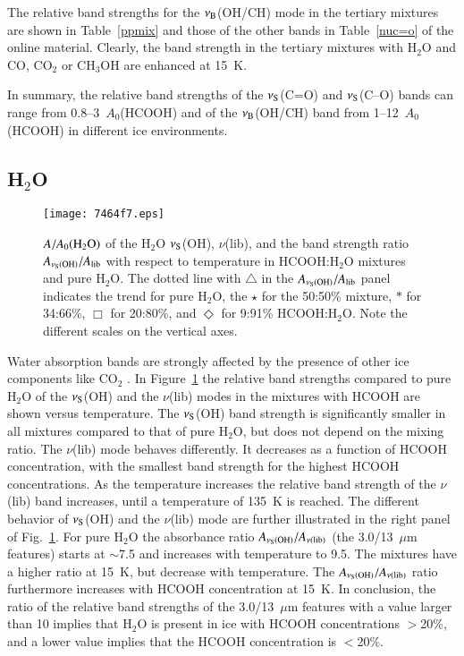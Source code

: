 \documentclass{aa}
\begin{document}
The relative band strengths for the $\nu_{\rm B}$(OH/CH) mode in the
tertiary mixtures are shown in Table~\ref{ppmix} and those of the
other bands in Table~\ref{nuc=o} of the online material. Clearly, the
band strength in the tertiary mixtures with H$_2$O and CO, CO$_2$ or
CH$_3$OH are enhanced at 15~K.

In summary, the relative band strengths of the $\nu_{\rm S}$(C=O) and
$\nu_{\rm S}$(C--O) bands can range from 0.8--3~$A_0$(HCOOH) and of
the $\nu_{\rm B}$(OH/CH) band from 1--12~$A_0$(HCOOH) in different ice
environments.

\subsection{H$_2$O}

\begin{figure}
\centering
\texttt{[image: 7464f7.eps]}
\caption{$A/A_0{\rm ( H_2O)}$ of the H$_2$O $\nu_{\rm S}$(OH),
  $\nu$(lib), and the band strength ratio $A_{\nu\rm_S (OH)}/A_{\rm
    lib}$ with respect to temperature in HCOOH:H$_2$O mixtures and
  pure H$_2$O. The dotted line with $\bigtriangleup$ in the $A_{\rm
    \nu_S(OH)}/A_{\rm lib}$ panel indicates the trend for pure H$_2$O,
  the $\star$ for the 50:50\% mixture, $\ast$ for 34:66\%, $\Box$ for
  20:80\%, and $\Diamond$ for 9:91\% HCOOH:H$_2$O. Note the different
  scales on the vertical axes.}\label{int_comp_h2o}
\end{figure}

Water absorption bands are strongly affected by the presence of other
ice components like CO$_2$ \citep{oberg2007}. In
Figure~\ref{int_comp_h2o} the relative band strengths compared to pure
H$_2$O of the $\nu_{\rm S}$(OH) and the $\nu$(lib) modes in the
mixtures with HCOOH are shown versus temperature. The $\nu_{\rm
  S}$(OH) band strength is significantly smaller in all mixtures
compared to that of pure H$_2$O, but does not depend on the mixing
ratio. The $\nu$(lib) mode behaves differently. It decreases as a
function of HCOOH concentration, with the smallest band strength for
the highest HCOOH concentrations. As the temperature increases the
relative band strength of the $\nu$(lib) band increases, until a
temperature of 135~K is reached. The different behavior of $\nu_{\rm
  S}$(OH) and the $\nu$(lib) mode are further illustrated in the right
panel of Fig.~\ref{int_comp_h2o}. For pure H$_2$O the absorbance ratio
$A_{\nu\rm_S (OH)}/A_{\nu\rm (lib)}$ (the 3.0/13~$\mu$m features)
starts at $\sim$7.5 and increases with temperature to 9.5. The
mixtures have a higher ratio at 15~K, but decrease with
temperature. The $A_{\nu\rm_S (OH)}/A_{\nu\rm (lib)}$ ratio
furthermore increases with HCOOH concentration at 15~K. In conclusion,
the ratio of the relative band strengths of the 3.0/13~$\mu$m features
with a value larger than 10 implies that H$_2$O is present in ice with
HCOOH concentrations $>$20\%, and a lower value implies that the HCOOH
concentration is $<$20\%.
\end{document}

